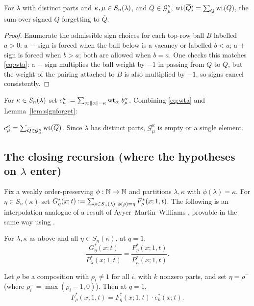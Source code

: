 \documentclass[11pt]{article}
\begin{document}
\begin{qthreelemma}\label{lem:signforget}
For $\lambda$ with distinct parts and $\kappa,\mu\in S_n(\lambda)$, and $\overline Q\in\mathcal G^\kappa_\mu$,
$\operatorname{wt}(\overline Q)=\sum_Q\operatorname{wt}(Q)$, the sum over signed $Q$ forgetting to $\overline Q$.
\end{qthreelemma}

\begin{proof}
Enumerate the admissible sign choices for each top-row ball $B$ labelled $a>0$:
a $-$ sign is forced when the ball below is a vacancy or labelled $b<a$; a $+$
sign is forced when $b>a$; both are allowed when $b=a$. One checks this matches
\eqref{eq:wta}: a $-$ sign multiplies the ball weight by $-1$ in passing from
$Q$ to $\overline Q$, but the weight of the pairing attached to $B$ is also
multiplied by $-1$, so signs cancel consistently.
\end{proof}

For $\kappa\in S_n(\lambda)$ set $c^\kappa_\mu:=\sum_{\alpha:\|\alpha\|=\kappa}\operatorname{wt}_\alpha\,b^\alpha_\mu$.
Combining \eqref{eq:wta} and Lemma~\ref{lem:signforget}:

\begin{qthreelemma}\label{lem:ckm}
$c^\kappa_\mu=\sum_{\overline Q\in\mathcal G^\kappa_\mu}\operatorname{wt}(\overline Q)$. Since $\lambda$ has distinct
parts, $\mathcal G^\kappa_\mu$ is empty or a single element.
\end{qthreelemma}

\subsection*{The closing recursion (where the hypotheses on $\lambda$ enter)}

Fix a weakly order-preserving $\phi:\mathbb{N}\to\mathbb{N}$ and partitions $\lambda,\kappa$ with
$\phi(\lambda)=\kappa$. For $\eta\in S_n(\kappa)$ set
$G^*_\eta(x;t):=\sum_{\rho\in S_n(\lambda):\,\phi(\rho)=\eta}F^*_\rho(x;1,t)$. The following
is an interpolation analogue of a result of Ayyer--Martin--Williams
\cite{AMW25}, provable in the same way using \cite{AS19}.

\begin{qthreetheorem}\label{thm:G}
For $\lambda,\kappa$ as above and all $\eta\in S_n(\kappa)$, at $q=1$,
\[
\frac{G^*_\eta(x;t)}{P^*_\lambda(x;1,t)}=\frac{F^*_\eta(x;1,t)}{P^*_\kappa(x;1,t)} .
\]
\end{qthreetheorem}

\begin{qthreecorollary}\label{cor:rec}
Let $\rho$ be a composition with $\rho_i\ne1$ for all $i$, with $k$ nonzero
parts, and set $\eta=\rho^-$ (where $\rho^-_i=\max(\rho_i-1,0)$). Then at $q=1$,
\[
F^*_\rho(x;1,t)=F^*_\eta(x;1,t)\cdot e^*_k(x;t).
\]
\end{qthreecorollary}
\end{document}
